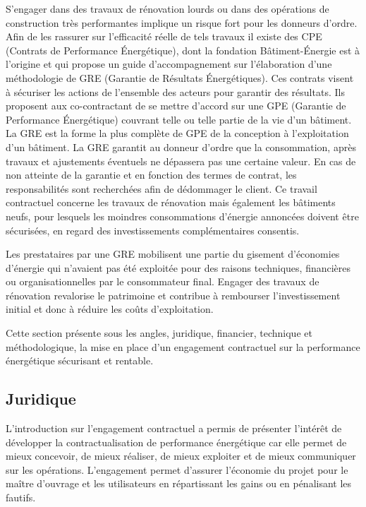 S'engager dans des travaux de rénovation lourds ou dans des opérations de construction très performantes implique un risque fort pour les donneurs d'ordre. Afin de les rassurer sur l'efficacité réelle de tels travaux il existe des CPE (Contrats de Performance Énergétique), dont la fondation Bâtiment-Énergie \cite{FBE-16} est à l'origine et qui propose un guide d'accompagnement sur l'élaboration d'une méthodologie de GRE (Garantie de Résultats Énergétiques). Ces contrats visent à sécuriser les actions de l'ensemble des acteurs pour garantir des résultats. Ils proposent aux co-contractant de se mettre d'accord sur une GPE (Garantie de Performance Énergétique) couvrant telle ou telle partie de la vie d'un bâtiment. La GRE est la forme la plus complète de GPE de la conception à l'exploitation d'un bâtiment. La GRE garantit au donneur d'ordre que la consommation, après travaux et ajustements éventuels ne dépassera pas une certaine valeur. En cas de non atteinte de la garantie et en fonction des termes de contrat, les responsabilités sont recherchées afin de dédommager le client. Ce travail contractuel concerne les travaux de rénovation mais également les bâtiments neufs, pour lesquels les moindres consommations d'énergie annoncées doivent être sécurisées, en regard des investissements complémentaires consentis.

Les prestataires par une GRE mobilisent une partie du gisement d'économies d'énergie qui n'avaient pas été exploitée pour des raisons techniques, financières ou organisationnelles par le consommateur final. Engager des travaux de rénovation revalorise le patrimoine et contribue à rembourser l'investissement initial et donc à réduire les coûts d'exploitation.

Cette section présente sous les angles, juridique, financier, technique et méthodologique, la mise en place d'un engagement contractuel sur la performance énergétique sécurisant et rentable.  

\subsection{Juridique}

L'introduction sur l'engagement contractuel a permis de présenter l'intérêt de développer la contractualisation de performance énergétique car elle permet de mieux concevoir, de mieux réaliser, de mieux exploiter et de mieux communiquer sur les opérations. L'engagement permet d'assurer l'économie du projet pour le maître d'ouvrage et les utilisateurs en répartissant les gains ou en pénalisant les fautifs. 

